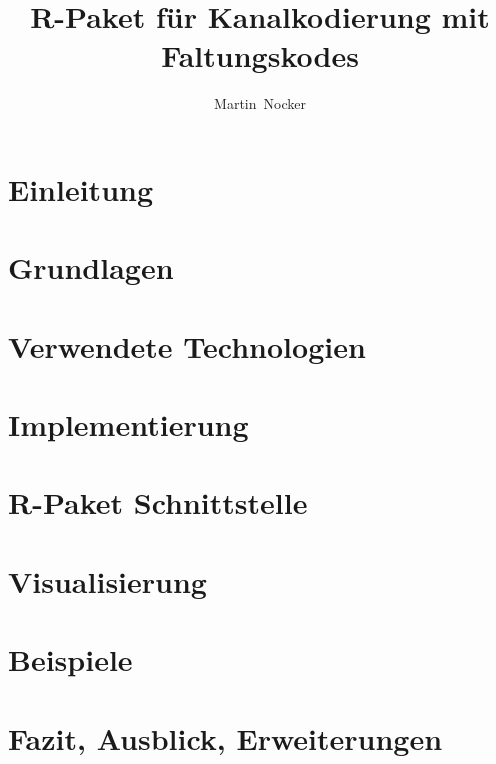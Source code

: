 \documentclass[germanthesis]{thesis-style}
\author{Martin~Nocker}
\title{R-Paket für Kanalkodierung mit Faltungskodes}
\begin{document}
\maketitle

\begin{abstract}

\end{abstract}

\tableofcontents
\clearpage
{}

\chapter{Einleitung}
\label{kapitel:einleitung}


\chapter{Grundlagen}
\label{kapitel:grundlagen}


\chapter{Verwendete Technologien}
\label{kapitel:technologien}


\chapter{Implementierung}
\label{kapitel:implementierung}


\chapter{R-Paket Schnittstelle}
\label{kapitel:interface}


\chapter{Visualisierung}
\label{kapitel:visualisierung}


\chapter{Beispiele}
\label{kapitel:beispiele}


\chapter{Fazit, Ausblick, Erweiterungen}
\label{kapitel:fazit}

\cleardoublepage%

\listofabbreviations
\clearpage

\listoffigures
\clearpage

\clearpage


\lstlistoflistings
\clearpage

\printbibliography
\end{document}
